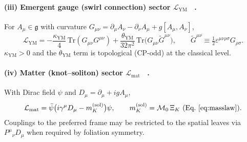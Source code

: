 \documentclass[10pt,reprint,aps,onecolumn,nofootinbib]{revtex4-2}
\begin{document}
\paragraph*{(iii) Emergent gauge (swirl connection) sector \(\mathcal{L}_{\mathrm{YM}}\)~ \cite{sstCanon,4}.}
    For \(A_\mu\in\mathfrak{g}\) with curvature
    \(G_{\mu\nu}=\partial_\mu A_\nu-\partial_\nu A_\mu+g[A_\mu,A_\nu]\),
    \begin{equation}
    \mathcal{L}_{\mathrm{YM}}
    =-\frac{\kappa_{\mathrm{YM}}}{4}\,\mathrm{Tr}(G_{\mu\nu}G^{\mu\nu})
    +\frac{\theta_{\mathrm{YM}}}{32\pi^2}\,
    \mathrm{Tr}\!\big(G_{\mu\nu}\tilde G^{\mu\nu}\big),
    \qquad
    \tilde G^{\mu\nu}\equiv\tfrac12\varepsilon^{\mu\nu\rho\sigma}G_{\rho\sigma}.
    \label{eq:LYM_app}
    \end{equation}
    \(\kappa_{\mathrm{YM}}>0\) and the \(\theta_{\mathrm{YM}}\) term is topological (CP-odd) at the classical level.

\paragraph*{(iv) Matter (knot–soliton) sector \(\mathcal{L}_{\mathrm{mat}}\)~ \cite{sstLagrangian}.}
    With Dirac field \(\psi\) and \(D_\mu=\partial_\mu+i g A_\mu\),
    \begin{equation}
    \mathcal{L}_{\mathrm{mat}}
    =\bar\psi\big(i\gamma^\mu D_\mu-m_K^{(\mathrm{sol})}\big)\psi,
    \qquad
    m_K^{(\mathrm{sol})}=\mathcal{M}_0\,\Xi_K
    \ \text{(Eq.~\ref{eq:masslaw})}.
    \label{eq:Lmat_app}
    \end{equation}
    Couplings to the preferred frame may be restricted to the spatial leaves via \(P^\mu{}_\nu D_\mu\) when required by foliation symmetry.
\end{document}
